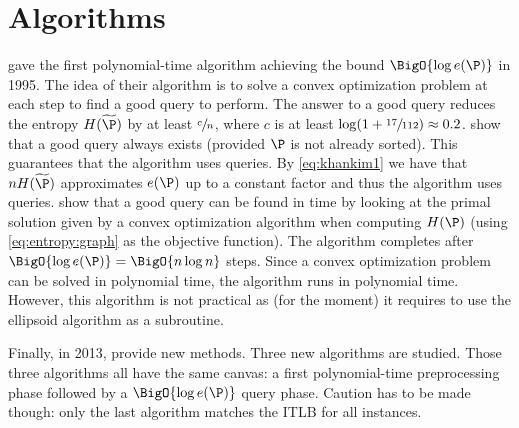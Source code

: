 \section{Algorithms}

\citet*{kahn:1995} gave the first polynomial-time algorithm achieving the bound
$\BigO{\log e(\P)}$ in 1995. The idea of their algorithm is to solve a convex
optimization problem at each step to find a good query to perform. The answer
to a good query reduces the entropy \(H(\widetilde{\P})\) by at least
\(\sfrac{c}{n}\), where \(c\) is at least \(\log(1+\sfrac{17}{112}) \approx
0.2\). \citet*{kahn:1995} show that a good query always exists (provided
\(\P\) is not already sorted). This guarantees that the algorithm uses
 queries. By \ref{eq:khankim1} we have that \(n
H(\widetilde{\P})\) approximates \(e(\P)\) up to a constant factor and thus the
algorithm uses  queries. \citet*{kahn:1995} show that a good
query can be found in  time by looking at the primal solution given
by a convex optimization algorithm when computing \(H(\P)\) (using
\ref{eq:entropy:graph} as the objective function). The algorithm completes
after \(\BigO{\log e(\P)} = \BigO{n \log n}\) steps. Since a convex
optimization problem can be solved in polynomial time, the algorithm runs in
polynomial time.
However, this algorithm
is not practical as (for the moment) it requires to use the ellipsoid
algorithm as a subroutine.

Finally, in 2013, \citet*{cardinal:2013} provide new methods. Three new
algorithms are studied. Those three algorithms all have the same canvas: a
first polynomial-time preprocessing phase followed by a $\BigO{\log e(\P)}$
query phase. Caution has to be made though: only the last
algorithm matches the ITLB for all \SUPI instances.

